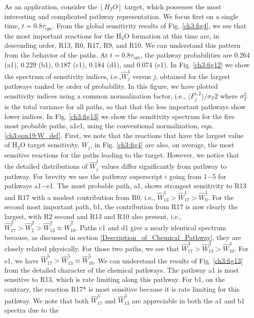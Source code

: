 As an application, consider the $\left[ H_2O \right]$ target, which
possesses the most interesting and complicated pathway
representation. We focus first on a single time, $t=0.8\tau_{ign}$.
From the global sensitivity results of Fig. \ref{ch3:fig4}, we see that the
most important reactions for the H$_2$O formation at this time
are, in descending order, R13, R0, R17, R9, and R10. We can
understand this pattern from the behavior of the paths. At $t=0.8\tau_{ign}$, the pathway probabilities are 0.264 (a1), 0.229 (b1),
0.187 (c1), 0.184 (d1), and 0.074 (e1). In Fig. \ref{ch3:fig12} we show the spectrum of sensitivity indices, i.e.,$\widehat{W}_j^{1}$ versus $j$, obtained for the largest pathways ranked by order of probability. In this
figure, we have plotted sensitivity indices using a common normalization factor, i.e., $ \langle F_j^{i,2} \rangle / \sigma_T{2}$ where $\sigma_T^2$ is the total variance
for all paths, so that that the less important pathways show
lower indices. In Fig. \ref{ch3:fig13} we show the sensitivity spectrum for
the five most probable paths, a1\-e1, using the conventional
normalization, eqn. \ref{ch3:eqn19:W_def}. First, we note that the reactions that have
the largest value of H$_2$O target sensitivity, $W_j$, in Fig. \ref{ch3:fig4} are
also, on average, the most sensitive reactions for the paths
leading to the target. However, we notice that the detailed
distributions of ${\widehat{W}}_j^{1}$ values differ significantly from pathway to
pathway. For brevity we use the pathway superscript $i$ going
from 1$-$5 for pathways a1$-$e1. The most probable path, a1,
shows strongest sensitivity to R13 and R17 with a modest
contribution from R0, i.e., ${\widehat{W}}_{13}^{1} > {\widehat{W}}_{17}^{1} > {\widehat{W}}_{0}^{1}$. For the second
most important path, b1, the contribution from R17 is now
clearly the largest, with R2 second and R13 and R10 also present, i.e., ${\widehat{W}}_{17}^{2} > {\widehat{W}}_{2}^{2} > {\widehat{W}}_{13}^{2} \approx {\widehat{W}}_{10}^{2}$. Paths c1 and d1 give a
nearly identical spectrum because, as discussed in section \ref{Description_of_Chemical_Pathway},
they are closely related physically. For those two paths, we see that ${\widehat{W}}_{17}^{3} > {\widehat{W}}_{13}^{3} > {\widehat{W}}_{10}^{3}$. For e1, we have ${\widehat{W}}_{17}^{5} > {\widehat{W}}_{13}^{5} \approx {\widehat{W}}_{10}^{5}$. We can understand the results of Fig. \ref{ch3:fig13} from the detailed
character of the chemical pathways. The pathway a1 is most
sensitive to R13, which is rate limiting along this pathway. For
b1, on the contrary, the reaction R17* is most sensitive because it is rate limiting for this pathway. We note that both ${\widehat{W}}_{17}^{3}$ and ${\widehat{W}}_{13}^{3}$ are appreciable in both the a1 and b1 spectra due to the
